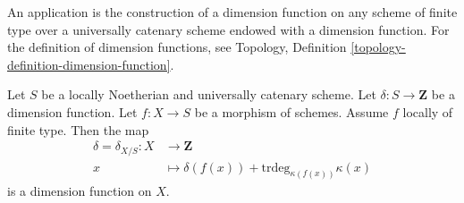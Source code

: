 \noindent
An application is the construction of a dimension function
on any scheme of finite type over a universally catenary
scheme endowed with a dimension function. For the definition
of dimension functions, see
Topology, Definition \ref{topology-definition-dimension-function}.

\begin{lemma}
\label{lemma-dimension-function-propagates}
Let $S$ be a locally Noetherian and universally catenary scheme.
Let $\delta : S \to \mathbf{Z}$ be a dimension function.
Let $f : X \to S$ be a morphism of schemes.
Assume $f$ locally of finite type.
Then the map
\begin{align*}
\delta = \delta_{X/S} : X & \longrightarrow \mathbf{Z} \\
x & \longmapsto \delta(f(x)) + \text{trdeg}_{\kappa(f(x))} \kappa(x)
\end{align*}
is a dimension function on $X$.
\end{lemma}

